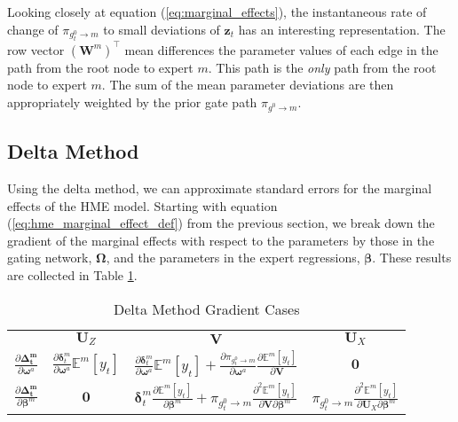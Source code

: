 \documentclass[12pt]{article}
\newcommand{\gateprod}[2]{\pi_{#1 \longrightarrow #2}}
\newcommand{\Eym}{\mathbb{E}^{m} \left[ y_{t} \right]}
\begin{document}
Looking closely at equation (\ref{eq:marginal_effects}), the instantaneous rate
of change of $\gateprod{g^{0}_{t}}{m}$ to small deviations of $\boldsymbol{z}_{t}$
has an interesting representation. The row vector $( \boldsymbol{W}^{m} )^{\top}$
mean differences the parameter values of each edge in the path from the
root node to expert $m$. This path is the \textit{only} path from the root
node to expert $m$. The sum of the mean parameter deviations are then appropriately
weighted by the prior gate path $\gateprod{g^{0}}{m}$.


\subsection{Delta Method}

Using the delta method, we can approximate standard
errors for the marginal effects of the HME model. Starting with equation
(\ref{eq:hme_marginal_effect_def}) from the previous section, we break down
the gradient of the marginal effects with respect to the parameters by those 
in the gating network, $\boldsymbol{\Omega}$, and the parameters in the
expert regressions, $\boldsymbol{\beta}$. These results are collected in Table
 \ref{tbl:delta_method_gradients}.

 \bigskip

\begin{table}
  \begin{center}
    \begin{tabular}{| l | c c c |}
    \hline
                                                                                    & \underline{$\boldsymbol{U}_{Z}$}                                                            & \underline{$\boldsymbol{V}$}                                                                                                                                                                                           & \underline{$\boldsymbol{U}_{X}$}   \\ [2ex]
    $\frac{\partial \boldsymbol{\Delta_{t}^{m}}}{\partial \boldsymbol{\omega}^{a}}$ & $\frac{\partial \boldsymbol{\delta}^{m}_{t}}{\partial \boldsymbol{\omega}^{a}} \Eym$        & $\frac{\partial \boldsymbol{\delta}^{m}_{t}}{\partial \boldsymbol{\omega}^{a}} \Eym + \frac{\partial \gateprod{g^{0}_{t}}{m}}{\partial \boldsymbol{\omega}^{a}}  \frac{\partial \Eym}{{\partial \boldsymbol{V}}}$  & $\boldsymbol{0}$                   \\ [2ex]
    $\frac{\partial \boldsymbol{\Delta_{t}^{m}}}{\partial \boldsymbol{\beta}^{m}}$  & $\boldsymbol{0}$                                                                            & $\boldsymbol{\delta}^{m}_{t} \frac{\partial \Eym}{\partial \boldsymbol{\beta}^{m}} + \gateprod{g^{0}_{t}}{m}   \frac{\partial^{2} \Eym}{\partial \boldsymbol{V} \partial \boldsymbol{\beta}^{m}}$    & $\gateprod{g^{0}_{t}}{m}  \frac{\partial^{2} \Eym}{\partial \boldsymbol{U}_{X} \partial \boldsymbol{\beta}^{m}}$  \\ [1ex]
    \hline
    \end{tabular}
  \caption{\label{tbl:delta_method_gradients} Delta Method Gradient Cases}
  \end{center}
\end{table}
\end{document}
